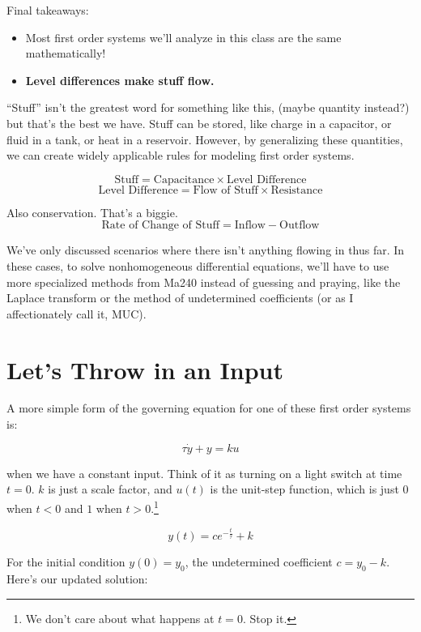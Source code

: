 \documentclass{report}
\begin{document}
\begin{onehalfspacing}
\begin{flushleft}
\medskip

Final takeaways:
\begin{itemize}[noitemsep,topsep=0.5pt]
    \item Most first order systems we'll analyze in this class are the same mathematically!
    \item \textbf{Level differences make stuff flow.}
\end{itemize}

\medskip

``Stuff'' isn't the greatest word for something like this, (maybe quantity instead?) but that's the best we have. Stuff can be stored, like charge in a capacitor, or fluid in a tank, or heat in a reservoir. However, by generalizing these quantities, we can create widely applicable rules for modeling first order systems.

\[\text{Stuff} = \text{Capacitance} \times \text{Level Difference}\]
\[\text{Level Difference} = \text{Flow of Stuff} \times \text{Resistance}\]

Also conservation. That's a biggie.
\[\text{Rate of Change of Stuff} = \text{Inflow} - \text{Outflow}\]

We've only discussed scenarios where there isn't anything flowing in thus far. In these cases, to solve nonhomogeneous differential equations, we'll have to use more specialized methods from Ma240 instead of guessing and praying, like the Laplace transform or the method of undetermined coefficients (or as I affectionately call it, MUC).

\section{Let's Throw in an Input}

A more simple form of the governing equation for one of these first order systems is:

\vspace{-0.1in}
\[\tau \dot{y} + y = ku\]

when we have a constant input. Think of it as turning on a light switch at time \(t=0\). \(k\) is just a scale factor, and \(u(t)\) is the unit-step function, which is just \(0\) when \(t<0\) and \(1\) when \(t>0\).\footnote{We don't care about what happens at \(t=0\). Stop it.}

\vspace{-0.1in}
\[y(t) = ce^{-\frac{t}{\tau}} + k\]

For the initial condition \(y(0) = y_0\), the undetermined coefficient \(c=y_0 - k\). Here's our updated solution:


\end{flushleft}
\end{onehalfspacing}
\end{document}
